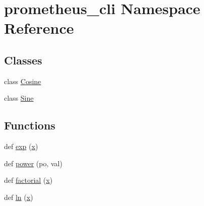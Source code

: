 \hypertarget{namespaceprometheus__cli}{}\section{prometheus\+\_\+cli Namespace Reference}
\label{namespaceprometheus__cli}
\subsection*{Classes}
\begin{DoxyCompactItemize}
\item 
class \hyperlink{classprometheus__cli_1_1_cosine}{Cosine}
\item 
class \hyperlink{classprometheus__cli_1_1_sine}{Sine}
\end{DoxyCompactItemize}
\subsection*{Functions}
\begin{DoxyCompactItemize}
\item 
def \hyperlink{namespaceprometheus__cli_a6fd1b33d0dbb51a2a390022894665f71}{exp} (\hyperlink{namespaceprometheus__cli_a879d50c5fa9ad1ef941818d332417a9b}{x})
\item 
def \hyperlink{namespaceprometheus__cli_a246b427a13a301189595d6df5a896321}{power} (po, val)
\item 
def \hyperlink{namespaceprometheus__cli_ac5d522288f61271b4d52dd3d1cca2395}{factorial} (\hyperlink{namespaceprometheus__cli_a879d50c5fa9ad1ef941818d332417a9b}{x})
\item 
def \hyperlink{namespaceprometheus__cli_af1c4dda8801e5fde4f9e01e0f1006d8c}{ln} (\hyperlink{namespaceprometheus__cli_a879d50c5fa9ad1ef941818d332417a9b}{x})
\end{DoxyCompactItemize}
